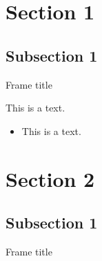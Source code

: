 \section{Section 1}
\subsection{Subsection 1}

\begin{frame}{Frame title}

This is a text.

\begin{itemize}
  \item This is a text.
\end{itemize}

\end{frame}

\section{Section 2}
\subsection{Subsection 1}

\begin{frame}{Frame title}

\end{frame}
